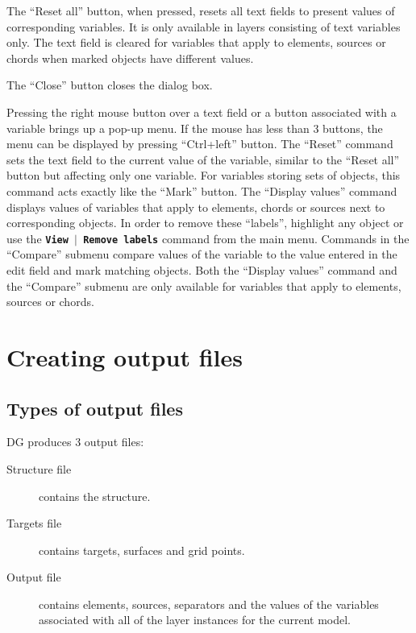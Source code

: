 \documentclass[12pt]{report}
\begin{document}
The ``Reset all'' button, when pressed, resets all text fields to
present values of corresponding variables. It is only available in
layers consisting of text variables only. The text field is cleared
for variables that apply to elements, sources or chords when marked
objects have different values.


The ``Close'' button closes the dialog box.

Pressing the right mouse button over a text field or a button
associated with a variable brings up a pop-up menu. If the mouse has
less than 3 buttons, the menu can be displayed by pressing ``Ctrl+left''
button.
The ``Reset'' command sets the text field to the current value of the
variable, similar to the ``Reset all'' button but affecting only one
variable. For variables storing sets of objects, this command acts
exactly like the ``Mark'' button.
The ``Display values'' command displays values of variables that apply
to elements, chords or sources next to corresponding objects. In order
to remove these ``labels'', highlight any object or use the 
\textbf{\texttt{View $\mid$ Remove labels}} command from the main menu.
Commands in the ``Compare'' submenu compare values of the variable to
the value entered in the edit field and mark matching objects.
Both the ``Display values'' command and the ``Compare'' submenu are only
available for variables that apply to elements, sources or chords.


\chapter{Creating output files}

\section{Types of output files}

DG produces 3 output files:

\begin{description}
  \item[Structure file] contains the structure.
  \item[Targets file] contains targets, surfaces and grid
points.
  \item[Output file] contains elements, sources, separators
and the values of the variables associated with all of the
layer instances for the current model.
\end{description}
\end{document}
